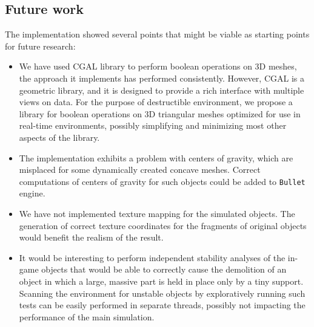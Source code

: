 \subsection*{Future work}
The implementation showed several points that might be viable as starting points for future research:
\begin{itemize}

\item We have used CGAL library to perform boolean operations on 3D meshes, the approach it implements has performed consistently. However, CGAL is a geometric library, and it is designed to provide a rich interface with multiple views on data. For the purpose of destructible environment, we propose a library for boolean operations on 3D triangular meshes optimized for use in real-time environments, possibly simplifying and minimizing most other aspects of the library.

\item The implementation exhibits a problem with centers of gravity, which are misplaced for some dynamically created concave meshes. Correct computations of centers of gravity for such objects could be added to \texttt{Bullet} engine.

\item We have not implemented texture mapping for the simulated objects. The generation of correct texture coordinates for the fragments of original objects would benefit the realism of the result.

\item It would be interesting to perform independent stability analyses of the in-game objects that would be able to \eg correctly cause the demolition of an object in which a large, massive part is held in place only by a tiny support. Scanning the environment for unstable objects by exploratively running such tests can be easily performed in separate threads, \ie possibly not impacting the performance of the main simulation.



\end{itemize}

